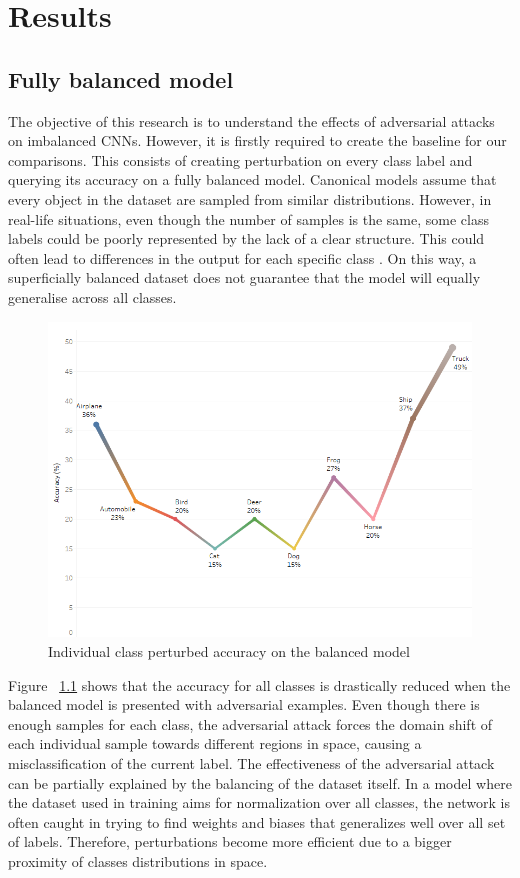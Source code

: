 

\chapter{Results}



\section{Fully balanced model}

The objective of this research is to understand the effects of adversarial attacks on imbalanced CNNs. However, it is firstly required to create the baseline for our comparisons. This consists of creating perturbation on every class label and querying its accuracy on a fully balanced model. Canonical models assume that every object in the dataset are sampled from similar distributions. However, in real-life situations, even though the number of samples is the same, some class labels could be poorly represented by the lack of a clear structure. This could often lead to differences in the output for each specific class \cite{krawczyk2016learning}. On this way, a superficially balanced dataset does not guarantee that the model will equally generalise across all classes.
\begin{figure}[H]
	\centering
	\includegraphics[scale=0.7]{balanced_perturbed.png}
	\caption{Individual class perturbed accuracy on the balanced model}
	\label{fig:balanced_perturbed}
\end{figure}

Figure ~\ref{fig:balanced_perturbed} shows that the accuracy for all classes is drastically reduced when the balanced model is presented with adversarial examples. Even though there is enough samples for each class, the adversarial attack forces the domain shift of each individual sample towards different regions in space, causing a misclassification of the current label. The effectiveness of the adversarial attack can be partially explained by the balancing of the dataset itself. In a model where the dataset used in training aims for normalization over all classes, the network is often caught in trying to find weights and biases that generalizes well over all set of labels. Therefore, perturbations become more efficient due to a bigger proximity of classes distributions in space.



